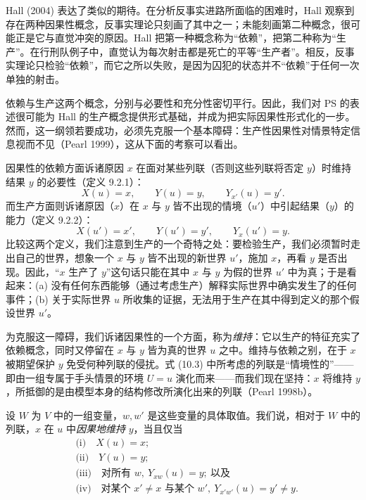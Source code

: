 Hall (2004) 表达了类似的期待。在分析反事实进路所面临的困难时，Hall 观察到存在两种因果性概念，反事实理论只刻画了其中之一；未能刻画第二种概念，很可能正是它与直觉冲突的原因。Hall 把第一种概念称为“依赖”，把第二种称为“生产”。在行刑队例子中，直觉认为每次射击都是死亡的平等“生产者”。相反，反事实理论只检验“依赖”，而它之所以失败，是因为囚犯的状态并不“依赖”于任何一次单独的射击。

依赖与生产这两个概念，分别与必要性和充分性密切平行。因此，我们对 PS 的表述很可能为 Hall 的生产概念提供形式基础，并成为把实际因果性形式化的一步。然而，这一纲领若要成功，必须先克服一个基本障碍：生产性因果性对情景特定信息视而不见（Pearl 1999），这从下面的考察可以看出。

因果性的依赖方面诉诸原因 $x$ 在面对某些列联（否则这些列联将否定 $y$）时维持结果 $y$ 的必要性（定义 9.2.1）：
\begin{equation}
X(u)=x,\qquad Y(u)=y,\qquad Y_{x'}(u)=y'.\tag{10.3}
\end{equation}
而生产方面则诉诸原因（$x$）在 $x$ 与 $y$ 皆不出现的情境（$u'$）中引起结果（$y$）的能力（定义 9.2.2）：
\begin{equation}
X(u')=x',\qquad Y(u')=y',\qquad Y_x(u')=y.\tag{10.4}
\end{equation}
比较这两个定义，我们注意到生产的一个奇特之处：要检验生产，我们必须暂时走出自己的世界，想象一个 $x$ 与 $y$ 皆不出现的新世界 $u'$，施加 $x$，再看 $y$ 是否出现。因此，“$x$ 生产了 $y$”这句话只能在其中 $x$ 与 $y$ 为假的世界 $u'$ 中为真；于是看起来：(a) 没有任何东西能够（通过考虑生产）解释实际世界中确实发生了的任何事件；(b) 关于实际世界 $u$ 所收集的证据，无法用于生产在其中得到定义的那个假设世界 $u'$。

为克服这一障碍，我们诉诸因果性的一个方面，称为\emph{维持}：它以生产的特征充实了依赖概念，同时又停留在 $x$ 与 $y$ 皆为真的世界 $u$ 之中。维持与依赖之别，在于 $x$ 被期望保护 $y$ 免受何种列联的侵扰。式 \textup{(10.3)} 中所考虑的列联是“情境性的”——即由一组专属于手头情景的环境 $U=u$ 演化而来——而我们现在坚持：$x$ 将维持 $y$，所抵御的是由模型本身的结构修改所演化出来的列联（Pearl 1998b）。

\begin{definition}[维持]
设 $W$ 为 $V$ 中的一组变量，$w,w'$ 是这些变量的具体取值。我们说，相对于 $W$ 中的列联，$x$ 在 $u$ 中\emph{因果地维持} $y$，当且仅当
\begin{equation}
\begin{aligned}
&\text{(i)}\quad X(u)=x;\\
&\text{(ii)}\quad Y(u)=y;\\
&\text{(iii)}\quad \text{对所有 } w,\ Y_{xw}(u)=y;\ \text{以及}\\
&\text{(iv)}\quad \text{对某个 } x'\neq x \text{ 与某个 } w',\ Y_{x'w'}(u)=y'\neq y.
\end{aligned}\tag{10.5}
\end{equation}
\end{definition}

